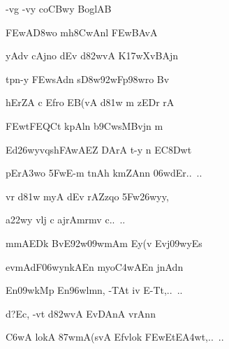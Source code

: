 {\dn -vg\?{\qvb} -vy\2 co\3CBwy BoglAB\2 }%
\dontdisplaylinenum


\nemslokad

{\dn \3FEwA\3D8wo mh\38CwAnl \3FEwBAvA \veg\dontdisplaylinenum }%


\vers


{\dn yAdv cAj\0no d\?Ev d\382wvA K\317wXvBAjn\thinspace{\dandab} \dontdisplaylinenum }%


{\dn tpn-y \3FEwsAd\?n s\3D8w\392wFp\?\398wro Bv\? \veg\dontdisplaylinenum }%


{\dn hErZA c Efro EB(vA d\381w\2 m\? zEDr\2 rA\thinspace{\dandab} \dontdisplaylinenum }%


{\dn \3FEwtFEQCt\2 kpAl\?n b\5\39CwsMBvj\?n m \veg\dontdisplaylinenum }%


{\dn Ed\326wyvq\0sh\3FAwAEZ DArA t-y n EC\38Dwt\?\thinspace{\dandab} \dontdisplaylinenum }%


{\dn pEr\3A3wo \35FwE-m t\?nAh\2 km\0ZAn\?n \306wdEr{..\dn\ ..} \veg\dontdisplaylinenum }%


{\dn vr\2 d\381w\2 myA d\?Ev rAZzqo \35Fw\326wyy,\thinspace{\dandab} \dontdisplaylinenum }%


{\dn a\322wy\2 vlj{\rdt} c ajrAmrm\?v c{..\dn\ ..} \veg\dontdisplaylinenum }%


{\dn mmAEDk\2 Bv\?E\392w\309wmA\0m Ey(v Evj\?\309wyEs\thinspace{\dandab} \dontdisplaylinenum }%

{\dn evmAdF\306wyn\?kAEn myo\3C4wAEn jnAd\0n\? \danda\dontdisplaylinenum }%


{\dn En\309wkMp En\396wlmn, -TAt iv E-Tt,{..\dn\ ..} \veg\dontdisplaylinenum }%


{\dn d{\rs ?\re}Ec, -vt\2 d\382wvA EvDAnA\2 vrAnn\?\thinspace{\dandab} \dontdisplaylinenum }%


{\dn {}\3C6wA lokA \387wmA(svA\0 Efvlok\? \3FEwEtE\3A4wt,{..\dn\ ..} \veg\dontdisplaylinenum }%



